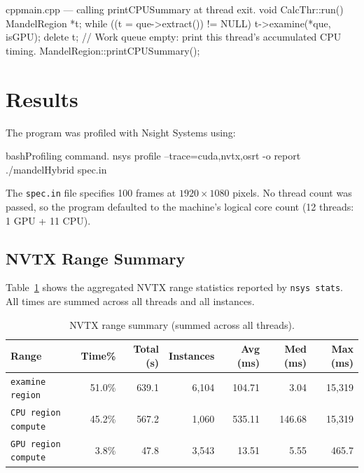 \documentclass[
	english,
	letterpaper, oneside
]{article}
\begin{document}
\begin{sourcecode}{cpp}{main.cpp — calling printCPUSummary at thread exit.}
void CalcThr::run()
{
    MandelRegion *t;
    while ((t = que->extract()) != NULL)
    {
        t->examine(*que, isGPU);
        delete t;
    }
    // Work queue empty: print this thread's accumulated CPU timing.
    MandelRegion::printCPUSummary();
}
\end{sourcecode}

\section{Results}

The program was profiled with Nsight Systems using:

\begin{sourcecode}{bash}{Profiling command.}
nsys profile --trace=cuda,nvtx,osrt -o report ./mandelHybrid spec.in
\end{sourcecode}

The \texttt{spec.in} file specifies 100 frames at $1920\times1080$ pixels.
No thread count was passed, so the program defaulted to the machine's
logical core count (12 threads: 1 GPU + 11 CPU).

\subsection{NVTX Range Summary}

Table~\ref{tab:nvtx} shows the aggregated NVTX range statistics reported
by \texttt{nsys stats}. All times are summed across all threads and all
instances.

\begin{table}[H]
    \centering
    \caption{NVTX range summary (summed across all threads).}
    \label{tab:nvtx}
    \begin{tabular}{lrrrrrr}
        \hline
        Range & Time\% & Total (s) & Instances & Avg (ms) & Med (ms) & Max (ms) \\
        \hline
        \texttt{examine region}     & 51.0\% & 639.1 & 6{,}104  & 104.71 &   3.04 & 15{,}319 \\
        \texttt{CPU region compute} & 45.2\% & 567.2 & 1{,}060  & 535.11 & 146.68 & 15{,}319 \\
        \texttt{GPU region compute} &  3.8\% &  47.8 & 3{,}543  &  13.51 &   5.55 &    465.7 \\
        \hline
    \end{tabular}
\end{table}
\end{document}
